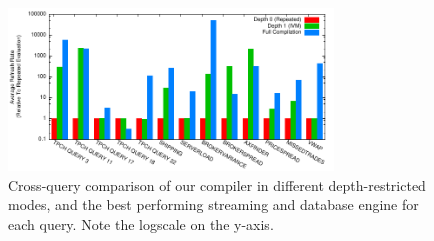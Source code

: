 
\newcommand{\figurewidth}[0]{1.8in}

\newcommand{\tablefig}[1]{
  \hspace*{-0.25in}
  \texttt{[image: ../graphs/graphs/\#1]}
}


\begin{figure}
\begin{center}
\includegraphics[width=3.4in]{../graphs/graphs/bakeoff.pdf}
\caption{Cross-query comparison of our compiler in different depth-restricted modes, and the best performing streaming and database engine for each query.  Note the logscale on the y-axis.}
\label{fig:experiments:bakeoff}
\end{center}
\end{figure}

